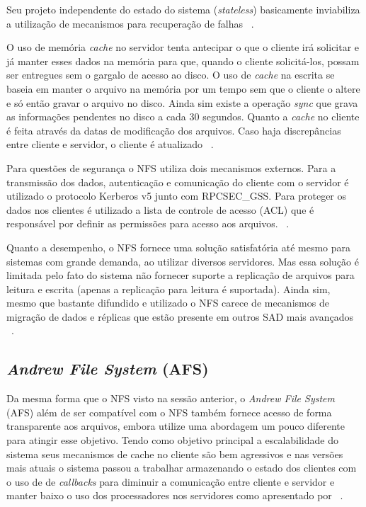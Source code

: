     Seu projeto independente do estado do sistema (\textit{stateless}) basicamente inviabiliza a utilização de mecanismos para recuperação de falhas ~\cite{coulouris}.
    
    O uso de memória \textit{cache} no servidor tenta antecipar o que o cliente irá solicitar e já manter esses dados na memória para que, quando o cliente solicitá-los, possam ser entregues sem o gargalo de acesso ao disco. O uso de \textit{cache} na escrita se baseia em manter o arquivo na memória por um tempo sem que o cliente o altere e só então gravar o arquivo no disco. Ainda sim existe a operação \textit{sync} que grava as informações pendentes no disco a cada 30 segundos.
    Quanto a \textit{cache} no cliente é feita através da datas de modificação dos arquivos. Caso haja discrepâncias entre cliente e servidor, o cliente é atualizado ~\cite{coulouris}.
    
    Para questões de segurança o NFS utiliza dois mecanismos externos. Para a transmissão dos dados, autenticação e comunicação do cliente com o servidor é utilizado o protocolo Kerberos v5 junto com RPCSEC\_GSS. Para proteger os dados nos clientes é utilizado a lista de controle de acesso (ACL) que é responsável por definir as permissões para acesso aos arquivos. ~\cite{tanenbaum}.
    
    Quanto a desempenho, o NFS fornece uma solução satisfatória até mesmo para sistemas com grande demanda, ao utilizar diversos servidores. Mas essa solução é limitada pelo fato do sistema não fornecer suporte a replicação de arquivos para leitura e escrita (apenas a replicação para leitura é suportada). Ainda sim, mesmo que bastante difundido e utilizado o NFS carece de mecanismos de migração de dados e réplicas que estão presente em outros SAD mais avançados ~\cite{coulouris}.
    


    \subsection{\textit{Andrew File System} (AFS)}

   
    Da mesma forma que o NFS visto na sessão anterior, o \textit{Andrew File System} (AFS) além de ser compatível com o NFS também fornece acesso de forma transparente aos arquivos, embora utilize uma abordagem um pouco diferente para atingir esse objetivo. Tendo como objetivo principal a escalabilidade do sistema seus mecanismos de cache no cliente são bem agressivos e nas versões mais atuais o sistema passou a trabalhar armazenando o estado dos clientes com o uso de de \textit{callbacks} para diminuir a comunicação entre cliente e servidor e manter baixo o uso dos processadores nos servidores como apresentado por ~\cite{coulouris}.
    
